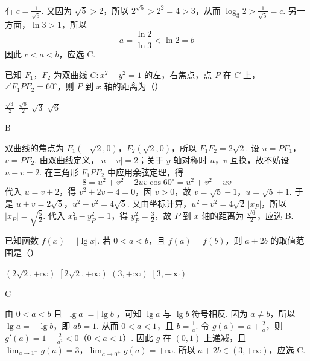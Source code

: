 \begin{solution}
有 \(c=\frac{1}{\sqrt5}\). 又因为 \(\sqrt5>2\)，所以 \(2^{\sqrt5}>2^{2}=4>3\)，从而
\(\log_{3}2>\frac{1}{\sqrt5}=c\). 另一方面，\(\ln3>1\)，所以
\[
a=\frac{\ln2}{\ln3}<\ln2=b
\]
因此 \(c<a<b\)，应选 C.
\end{solution}

\begin{problem}
已知 \(F_{1}\)，\(F_{2}\) 为双曲线 \(C: x^{2} - y^{2} = 1\) 的左，右焦点，点 \(P\) 在 \(C\) 上，\(\angle F_{1}PF_{2} = 60^{\circ}\)，则 \(P\) 到 \(x\) 轴的距离为（\quad）

\choices
    {\(\frac{\sqrt{3}}{2}\)}
    {\(\frac{\sqrt{6}}{2}\)}
    {\(\sqrt{3}\)}
    {\(\sqrt{6}\)}
\end{problem}

\begin{answer}
B
\end{answer}

\begin{solution}
双曲线的焦点为 \(F_{1}(-\sqrt2,0)\)，\(F_{2}(\sqrt2,0)\)，所以
\(F_{1}F_{2}=2\sqrt2\). 设 \(u=PF_{1}\)，\(v=PF_{2}\). 由双曲线定义，\(|u-v|=2\)；关于 \(y\) 轴对称时 \(u\)，\(v\) 互换，故不妨设 \(u-v=2\). 在三角形 \(F_{1}PF_{2}\) 中应用余弦定理，得
\[
8=u^{2}+v^{2}-2uv\cos60^{\circ}=u^{2}+v^{2}-uv
\]
代入 \(u=v+2\)，得 \(v^{2}+2v-4=0\)，因 \(v>0\)，故 \(v=\sqrt5-1\)，\(u=\sqrt5+1\). 于是
\(u+v=2\sqrt5\)，\(u^{2}-v^{2}=4\sqrt5\).
又由坐标计算，\(u^{2}-v^{2}=4\sqrt2\,|x_{P}|\)，所以 \(|x_{P}|=\sqrt{\frac{5}{2}}\). 代入
\(x_{P}^{2}-y_{P}^{2}=1\)，得 \(y_{P}^{2}=\frac{3}{2}\)，故 \(P\) 到 \(x\) 轴的距离为
\(\frac{\sqrt6}{2}\)，应选 B.
\end{solution}

\begin{problem}
已知函数 \( f(x) = |\lg x| \). 若 \( 0 < a < b \)，且 \( f(a) = f(b) \)，则 \( a + 2b \) 的取值范围是（\quad）

\choices
    {\(\left(2\sqrt{2},+\infty\right)\)}
    {\(\left[2\sqrt{2},+\infty\right)\)}
    {\(\left(3,+\infty\right)\)}
    {\(\left[3,+\infty\right)\)}
\end{problem}

\begin{answer}
C
\end{answer}

\begin{solution}
由 \(0<a<b\) 且 \(|\lg a|=|\lg b|\)，可知 \(\lg a\) 与 \(\lg b\) 符号相反. 因为 \(a\ne b\)，所以
\(\lg a=-\lg b\)，即 \(ab=1\). 从而 \(0<a<1\)，且 \(b=\frac{1}{a}\). 令
\(g(a)=a+\frac{2}{a}\)，则 \(g'(a)=1-\frac{2}{a^{2}}<0\)（\(0<a<1\)）. 因此 \(g\) 在 \((0,1)\) 上递减，且
\(\lim_{a\to1^{-}}g(a)=3\)，\(\lim_{a\to0^{+}}g(a)=+\infty\).
所以 \(a+2b\in(3,+\infty)\)，应选 C.
\end{solution}

